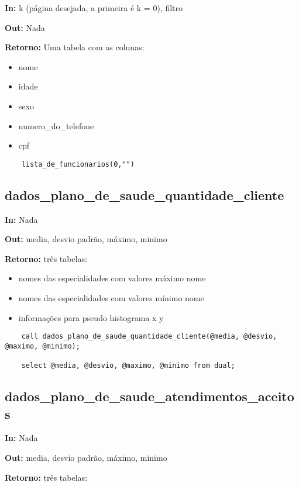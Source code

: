 \textbf{In:} k (página desejada, a primeira é k = 0), filtro

\textbf{Out:} Nada

\textbf{Retorno:} Uma tabela com as colunas:

\begin{itemize}
	\item nome
	\item idade
	\item sexo
	\item numero\_do\_telefone
	\item cpf
\end{itemize}

\begin{verbatim}
	lista_de_funcionarios(0,"")
\end{verbatim}


\subsection{dados\_plano\_de\_saude\_quantidade\_cliente}

\textbf{In:} Nada

\textbf{Out:} media, desvio padrão, máximo, minimo

\textbf{Retorno:} três tabelas:

\begin{itemize}
	\item nomes das especialidades com valores máximo
	\subitem nome
	\item nomes das especialidades com valores mínimo
	\subitem nome
	\item informações para pseudo histograma
	\subitem x
	\subitem y
\end{itemize}

\begin{verbatim}
	call dados_plano_de_saude_quantidade_cliente(@media, @desvio, @maximo, @minimo);
	
	select @media, @desvio, @maximo, @minimo from dual;
\end{verbatim}

\subsection{dados\_plano\_de\_saude\_atendimentos\_aceitos}

\textbf{In:} Nada

\textbf{Out:} media, desvio padrão, máximo, minimo

\textbf{Retorno:} três tabelas:


